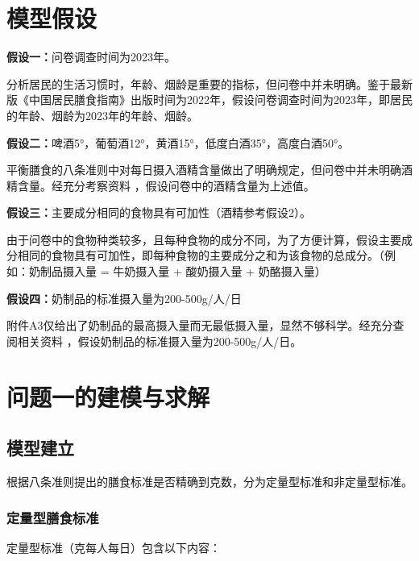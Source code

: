 \documentclass{article}
\numberwithin{equation}{subsection}
\begin{document}
{\centering\section{模型假设}}

\textbf{假设一：}问卷调查时间为2023年。

\noindent
分析居民的生活习惯时，年龄、烟龄是重要的指标，但问卷中并未明确。鉴于最新版《中国居民膳食指南》出版时间为2022年，假设问卷调查时间为2023年，即居民的年龄、烟龄为2023年的年龄、烟龄。
    
\textbf{假设二：}啤酒5°，葡萄酒12°，黄酒15°，低度白酒35°，高度白酒50°。

\noindent
平衡膳食的八条准则中对每日摄入酒精含量做出了明确规定，但问卷中并未明确酒精含量。经充分考察资料\cite {2} ，假设问卷中的酒精含量为上述值。

\textbf{假设三：}主要成分相同的食物具有可加性（酒精参考假设2）。

\noindent
由于问卷中的食物种类较多，且每种食物的成分不同，为了方便计算，假设主要成分相同的食物具有可加性，即每种食物的主要成分之和为该食物的总成分。（例如：奶制品摄入量 = 牛奶摄入量 + 酸奶摄入量 + 奶酪摄入量）

\textbf{假设四：}奶制品的标准摄入量为200-500g/人/日

\noindent
附件A3仅给出了奶制品的最高摄入量而无最低摄入量，显然不够科学。经充分查阅相关资料\cite {1} ，假设奶制品的标准摄入量为200-500g/人/日。



{\centering\section{问题一的建模与求解}}

\subsection{模型建立}
根据八条准则提出的膳食标准是否精确到克数，分为定量型标准和非定量型标准。

\subsubsection{定量型膳食标准}
定量型标准（克每人每日）包含以下内容：
\end{document}

